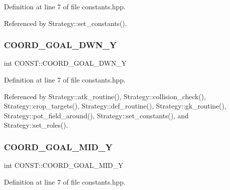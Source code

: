 Definition at line 7 of file constants.\+hpp.



Referenced by Strategy\+::set\+\_\+constants().

\mbox{\label{namespace_c_o_n_s_t_a97382a534273f1ca10b7cdf29fab9d0a}} 
\subsubsection{\texorpdfstring{C\+O\+O\+R\+D\+\_\+\+G\+O\+A\+L\+\_\+\+D\+W\+N\+\_\+Y}{COORD\_GOAL\_DWN\_Y}}
{\footnotesize\ttfamily int C\+O\+N\+S\+T\+::\+C\+O\+O\+R\+D\+\_\+\+G\+O\+A\+L\+\_\+\+D\+W\+N\+\_\+Y\hspace{0.3cm}{\ttfamily [static]}}



Definition at line 7 of file constants.\+hpp.



Referenced by Strategy\+::atk\+\_\+routine(), Strategy\+::collision\+\_\+check(), Strategy\+::crop\+\_\+targets(), Strategy\+::def\+\_\+routine(), Strategy\+::gk\+\_\+routine(), Strategy\+::pot\+\_\+field\+\_\+around(), Strategy\+::set\+\_\+constants(), and Strategy\+::set\+\_\+roles().

\mbox{\label{namespace_c_o_n_s_t_a227a51bc8809f1391dc096eafb6b1d85}} 
\subsubsection{\texorpdfstring{C\+O\+O\+R\+D\+\_\+\+G\+O\+A\+L\+\_\+\+M\+I\+D\+\_\+Y}{COORD\_GOAL\_MID\_Y}}
{\footnotesize\ttfamily int C\+O\+N\+S\+T\+::\+C\+O\+O\+R\+D\+\_\+\+G\+O\+A\+L\+\_\+\+M\+I\+D\+\_\+Y\hspace{0.3cm}{\ttfamily [static]}}



Definition at line 7 of file constants.\+hpp.



